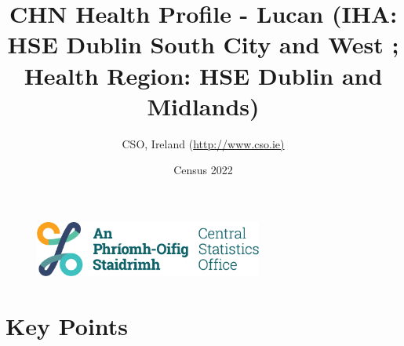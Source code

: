 \documentclass{article}
\title{CHN Health Profile - Lucan (IHA: HSE Dublin South City and West ;  Health Region: HSE Dublin and Midlands) }
\date{Census 2022}
\author{CSO, Ireland  (\url{http://www.cso.ie)}}
\begin{document}


\begin{figure}
	\centering
\includegraphics[width =75mm]{../figures/CSO_Logo.png}
\end{figure}

				 
		   
						  
														  
																																													
												 
			 
\maketitle
					
													   
				 
						 
																																																																											   
				 
				  
  \pagebreak
    	    \tableofcontents

\pagebreak


\section{Key Points}
\end{document}
